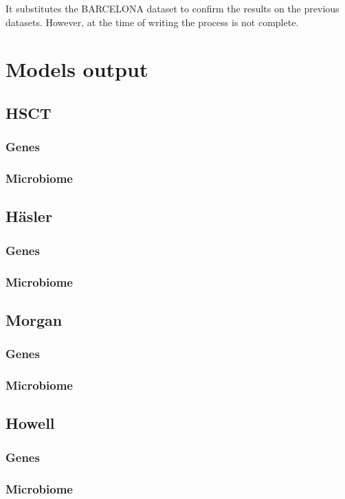 \documentclass[
  12pt,
  a4paper,
  twoside,
  openright]{book}
\begin{document}
It substitutes the BARCELONA dataset to confirm the results on the previous datasets.
However, at the time of writing the process is not complete.

\hypertarget{models-output}{%
\chapter{Models output}\label{models-output}}

\hypertarget{hsct}{%
\section{HSCT}\label{hsct}}

\hypertarget{genes}{%
\subsection{Genes}\label{genes}}

\hypertarget{microbiome-2}{%
\subsection{Microbiome}\label{microbiome-2}}

\hypertarget{huxe4sler}{%
\section{Häsler}\label{huxe4sler}}

\hypertarget{genes-1}{%
\subsection{Genes}\label{genes-1}}

\hypertarget{microbiome-3}{%
\subsection{Microbiome}\label{microbiome-3}}

\hypertarget{morgan}{%
\section{Morgan}\label{morgan}}

\hypertarget{genes-2}{%
\subsection{Genes}\label{genes-2}}

\hypertarget{microbiome-4}{%
\subsection{Microbiome}\label{microbiome-4}}

\hypertarget{howell}{%
\section{Howell}\label{howell}}

\hypertarget{genes-3}{%
\subsection{Genes}\label{genes-3}}

\hypertarget{microbiome-5}{%
\subsection{Microbiome}\label{microbiome-5}}
\end{document}
